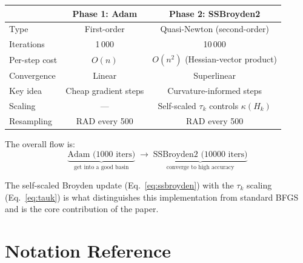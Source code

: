 \documentclass[11pt,a4paper]{article}
\begin{document}
\begin{center}
\renewcommand{\arraystretch}{1.4}
\begin{tabular}{@{}lcc@{}}
\toprule
& \textbf{Phase 1: Adam} & \textbf{Phase 2: SSBroyden2} \\
\midrule
Type       & First-order     & Quasi-Newton (second-order) \\
Iterations & 1\,000          & 10\,000 \\
Per-step cost & $O(n)$       & $O(n^2)$ (Hessian-vector product) \\
Convergence & Linear         & Superlinear \\
Key idea   & Cheap gradient steps & Curvature-informed steps \\
Scaling    & ---             & Self-scaled $\tau_k$ controls $\kappa(H_k)$ \\
Resampling & RAD every 500   & RAD every 500 \\
\bottomrule
\end{tabular}
\end{center}

The overall flow is:
\[
  \underbrace{\text{Adam (1000 iters)}}_{\text{get into a good basin}}
  \;\longrightarrow\;
  \underbrace{\text{SSBroyden2 (10000 iters)}}_{\text{converge to high accuracy}}
\]

The self-scaled Broyden update (Eq.~\eqref{eq:ssbroyden}) with the
$\tau_k$ scaling (Eq.~\eqref{eq:tauk}) is what distinguishes this
implementation from standard BFGS and is the core contribution of the
paper.

\appendix
\section{Notation Reference}
\end{document}
